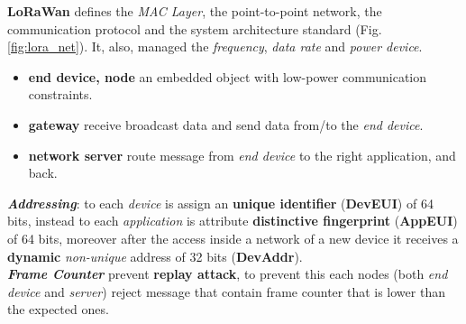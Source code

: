 \textbf{LoRaWan} defines the \textit{MAC Layer}, the point-to-point network, the communication protocol and the system architecture standard (Fig. \ref{fig:lora_net}). It, also, managed the \textit{frequency}, \textit{data rate} and \textit{power device}.
\begin{itemize}[nosep]
    \item \textbf{end device, node} an embedded object with low-power communication constraints.
    \item \textbf{gateway} receive broadcast data and send data from/to the \textit{end device}.
    \item \textbf{network server} route message from \textit{end device} to the right application, and back.
\end{itemize}
\textbf{\textit{Addressing}}: to each \textit{device} is assign an \textbf{unique identifier} (\textbf{DevEUI}) of 64 bits, instead to each \textit{application} is attribute \textbf{distinctive fingerprint} (\textbf{AppEUI}) of 64 bits, moreover after the access inside a network of a new device it receives a \textbf{dynamic} \textit{non-unique} address of 32 bits (\textbf{DevAddr}). \\ \newline
\textbf{\textit{Frame Counter}} prevent \textbf{replay attack}, to prevent this each nodes (both \textit{end device} and \textit{server}) reject message that contain frame counter that is lower than the expected ones.

